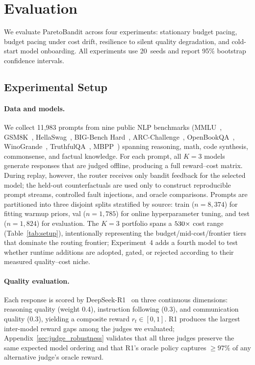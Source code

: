 \section{Evaluation}
\label{sec:evaluation}

We evaluate ParetoBandit across four experiments: stationary budget pacing, budget pacing under cost drift, resilience to silent quality degradation, and cold-start model onboarding. All experiments use 20~seeds and report 95\% bootstrap confidence intervals.

\subsection{Experimental Setup}
\label{sec:eval_setup}

\paragraph{Data and models.}
We collect 11,983 prompts from nine public NLP benchmarks (MMLU~\cite{hendrycks2021measuring}, GSM8K~\cite{cobbe2021gsm8k}, HellaSwag~\cite{zellers2019hellaswag}, BIG-Bench Hard~\cite{suzgun2022challenging}, ARC-Challenge~\cite{clark2018arc}, OpenBookQA~\cite{mihaylov2018suit}, WinoGrande~\cite{sakaguchi2020winogrande}, TruthfulQA~\cite{lin2022truthfulqa}, MBPP~\cite{austin2021program}) spanning reasoning, math, code synthesis, commonsense, and factual knowledge. For each prompt, all $K{=}3$ models generate responses that are judged offline, producing a full reward--cost matrix. During replay, however, the router receives only bandit feedback for the selected model; the held-out counterfactuals are used only to construct reproducible prompt streams, controlled fault injections, and oracle comparisons. Prompts are partitioned into three disjoint splits stratified by source: train ($n{=}8{,}374$) for fitting warmup priors, val ($n{=}1{,}785$) for online hyperparameter tuning, and test ($n{=}1{,}824$) for evaluation. The $K{=}3$ portfolio spans a $530{\times}$ cost range (Table~\ref{tab:setup}), intentionally representing the budget/mid-cost/frontier tiers that dominate the routing frontier; Experiment~4 adds a fourth model to test whether runtime additions are adopted, gated, or rejected according to their measured quality--cost niche.

\paragraph{Quality evaluation.}
Each response is scored by DeepSeek-R1~\cite{deepseekai2025deepseekr1} on three continuous dimensions: reasoning quality (weight 0.4), instruction following (0.3), and communication quality (0.3), yielding a composite reward $r_t \in [0, 1]$. R1 produces the largest inter-model reward gaps among the judges we evaluated; Appendix~\ref{sec:judge_robustness} validates that all three judges preserve the same expected model ordering and that R1's oracle policy captures ${\geq}97\%$ of any alternative judge's oracle reward.

